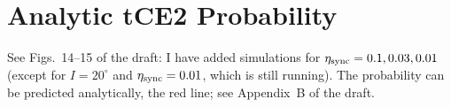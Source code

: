 \documentclass[11pt,
        usenames, %
        dvipsnames %
    ]{article}
\newcommand*{\bm}[1]{\boldsymbol{\mathbf{#1}}}
\newcommand*{\p}[1]{\left(#1\right)}
\newcommand*{\s}[1]{\left[#1\right]}
\begin{document}


\section{Analytic tCE2 Probability}

See Figs.~14--15 of the draft: I have added simulations for $\eta_{\rm sync} =
0.1, 0.03, 0.01$ (except for $I = 20^\circ$ and $\eta_{\rm sync} = 0.01$, which
is still running). The probability can be predicted analytically, the red line;
see Appendix~B of the draft.
\end{document}
